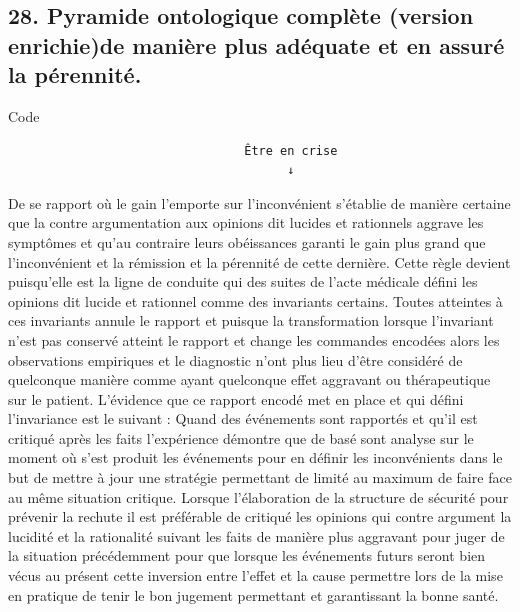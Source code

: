 \documentclass[12pt,letterpaper,oneside]{article}
\begin{document}
\subsection*{28. Pyramide ontologique complète (version enrichie)de manière plus adéquate et en assuré la pérennité.}
Code
\begin{verbatim}
                                 Être en crise
                                       ↓
\end{verbatim}
De se rapport où le gain l’emporte sur l’inconvénient s’établie de manière certaine que la contre argumentation aux opinions dit lucides et rationnels aggrave les symptômes et qu’au contraire leurs obéissances garanti le gain plus grand que l’inconvénient et la rémission et la pérennité de cette dernière. Cette règle devient puisqu’elle est la ligne de conduite qui des suites de l’acte médicale défini les opinions dit lucide et rationnel comme des invariants certains. Toutes atteintes à ces invariants annule le rapport et puisque la transformation lorsque l’invariant n’est pas conservé atteint le rapport et change les commandes encodées alors les observations empiriques et le diagnostic n’ont plus lieu d’être considéré de quelconque manière comme ayant quelconque effet aggravant ou thérapeutique sur le patient.
L’évidence que ce rapport encodé met en place et qui défini l’invariance est le suivant : Quand des événements sont rapportés et qu’il est critiqué après les faits l’expérience démontre que de basé sont analyse sur le moment où s’est produit les événements pour en définir les inconvénients dans le but de mettre à jour une stratégie permettant de limité au maximum de faire face au même situation critique. Lorsque l’élaboration de la structure de sécurité pour prévenir la rechute il est préférable de critiqué les opinions qui contre argument la lucidité et la rationalité suivant les faits de manière plus aggravant pour juger de la situation précédemment pour que lorsque les événements futurs seront bien vécus au présent cette inversion entre l’effet et la cause permettre lors de la mise en pratique de tenir le bon jugement permettant et garantissant la bonne santé.
\end{document}

